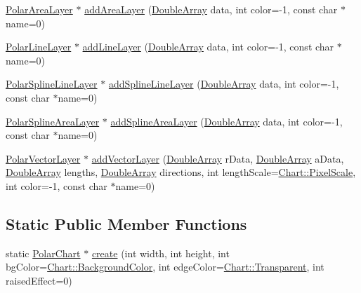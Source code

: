 \begin{DoxyCompactItemize}
\item 
\hyperlink{class_polar_area_layer}{Polar\+Area\+Layer} $\ast$ \hyperlink{class_polar_chart_a36a592c0473d015113d9add78d9dfbad}{add\+Area\+Layer} (\hyperlink{class_double_array}{Double\+Array} data, int color=-\/1, const char $\ast$name=0)
\item 
\hyperlink{class_polar_line_layer}{Polar\+Line\+Layer} $\ast$ \hyperlink{class_polar_chart_a5d54191f10884a95b52f3098a4e33c3c}{add\+Line\+Layer} (\hyperlink{class_double_array}{Double\+Array} data, int color=-\/1, const char $\ast$name=0)
\item 
\hyperlink{class_polar_spline_line_layer}{Polar\+Spline\+Line\+Layer} $\ast$ \hyperlink{class_polar_chart_a7f51e9599161df80a632fcb512a9c4fc}{add\+Spline\+Line\+Layer} (\hyperlink{class_double_array}{Double\+Array} data, int color=-\/1, const char $\ast$name=0)
\item 
\hyperlink{class_polar_spline_area_layer}{Polar\+Spline\+Area\+Layer} $\ast$ \hyperlink{class_polar_chart_a490b2bb4cc48418f66065fa2ba1dd005}{add\+Spline\+Area\+Layer} (\hyperlink{class_double_array}{Double\+Array} data, int color=-\/1, const char $\ast$name=0)
\item 
\hyperlink{class_polar_vector_layer}{Polar\+Vector\+Layer} $\ast$ \hyperlink{class_polar_chart_a23fe6742c905e05ba49aaca646aef921}{add\+Vector\+Layer} (\hyperlink{class_double_array}{Double\+Array} r\+Data, \hyperlink{class_double_array}{Double\+Array} a\+Data, \hyperlink{class_double_array}{Double\+Array} lengths, \hyperlink{class_double_array}{Double\+Array} directions, int length\+Scale=\hyperlink{namespace_chart_af8005281e1fb57d737e9f89b13605808afebebf69a28e58958dc5f9da3ece2147}{Chart\+::\+Pixel\+Scale}, int color=-\/1, const char $\ast$name=0)
\end{DoxyCompactItemize}
\subsection*{Static Public Member Functions}
\begin{DoxyCompactItemize}
\item 
static \hyperlink{class_polar_chart}{Polar\+Chart} $\ast$ \hyperlink{class_polar_chart_a0535130cd8a43ad6398f04acaf9d0614}{create} (int width, int height, int bg\+Color=\hyperlink{namespace_chart_abee0d882fdc9ad0b001245ad9fc64011a134193bde693b9d152d0c6dc59fa7d7f}{Chart\+::\+Background\+Color}, int edge\+Color=\hyperlink{namespace_chart_abee0d882fdc9ad0b001245ad9fc64011afc6811800a9e2582dac0157b6279f836}{Chart\+::\+Transparent}, int raised\+Effect=0)
\end{DoxyCompactItemize}
